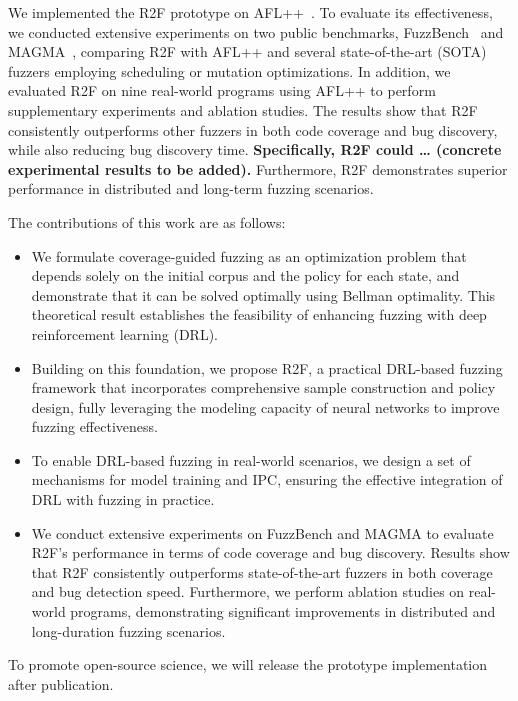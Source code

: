 \documentclass[lettersize,journal]{IEEEtran}
\begin{document}
We implemented the R2F prototype on AFL++~\cite{fioraldiAFLCombiningIncremental2020}. To evaluate its effectiveness, we conducted extensive experiments on two public benchmarks, FuzzBench~\cite{metzmanFuzzBenchOpenFuzzer2021} and MAGMA~\cite{hazimehMagmaGroundtruthFuzzing2021}, comparing R2F with AFL++ and several state-of-the-art (SOTA) fuzzers employing scheduling or mutation optimizations. In addition, we evaluated R2F on nine real-world programs using AFL++ to perform supplementary experiments and ablation studies. The results show that R2F consistently outperforms other fuzzers in both code coverage and bug discovery, while also reducing bug discovery time. \textbf{Specifically, R2F could … (concrete experimental results to be added).} Furthermore, R2F demonstrates superior performance in distributed and long-term fuzzing scenarios.

The contributions of this work are as follows:
\begin{itemize}
	\item We formulate coverage-guided fuzzing as an optimization problem that depends solely on the initial corpus and the policy for each state, and demonstrate that it can be solved optimally using Bellman optimality. This theoretical result establishes the feasibility of enhancing fuzzing with deep reinforcement learning (DRL).
	\item Building on this foundation, we propose R2F, a practical DRL-based fuzzing framework that incorporates comprehensive sample construction and policy design, fully leveraging the modeling capacity of neural networks to improve fuzzing effectiveness.
	\item To enable DRL-based fuzzing in real-world scenarios, we design a set of mechanisms for model training and IPC, ensuring the effective integration of DRL with fuzzing in practice.
	\item We conduct extensive experiments on FuzzBench and MAGMA to evaluate R2F’s performance in terms of code coverage and bug discovery. Results show that R2F consistently outperforms state-of-the-art fuzzers in both coverage and bug detection speed. Furthermore, we perform ablation studies on real-world programs, demonstrating significant improvements in distributed and long-duration fuzzing scenarios.
\end{itemize}

To promote open-source science, we will release the prototype implementation after publication.
\end{document}
